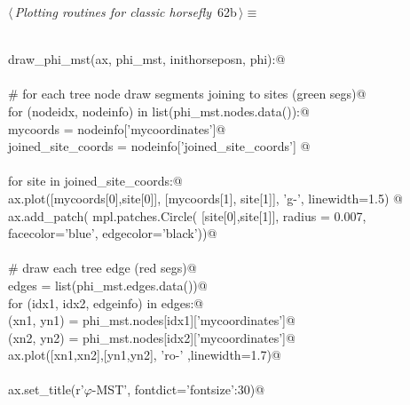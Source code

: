\documentclass[11.5pt]{report}
\begin{document}
\vspace{-0.8cm} \newchunk 

\begin{flushleft} \small\label{scrap90}\raggedright\small
{} $\langle\,${\itshape Plotting routines for classic horsefly}\nobreak\ {\footnotesize {62b}}$\,\rangle\equiv$
\vspace{-1ex}
\begin{list}{}{} \item
\mbox{}\verb@@\\
\mbox{}\verb@def draw_phi_mst(ax, phi_mst, inithorseposn, phi):@\\
\mbox{}\verb@@\\
\mbox{}\verb@     # for each tree node draw segments joining to sites (green segs)@\\
\mbox{}\verb@     for (nodeidx, nodeinfo) in list(phi_mst.nodes.data()):@\\
\mbox{}\verb@         mycoords           = nodeinfo['mycoordinates']@\\
\mbox{}\verb@         joined_site_coords = nodeinfo['joined_site_coords'] @\\
\mbox{}\verb@@\\
\mbox{}\verb@         for site in joined_site_coords:@\\
\mbox{}\verb@               ax.plot([mycoords[0],site[0]], [mycoords[1], site[1]], 'g-', linewidth=1.5) @\\
\mbox{}\verb@               ax.add_patch( mpl.patches.Circle( [site[0],site[1]], radius = 0.007, \@\\
\mbox{}\verb@                                                 facecolor='blue', edgecolor='black'))@\\
\mbox{}\verb@@\\
\mbox{}\verb@     # draw each tree edge (red segs)@\\
\mbox{}\verb@     edges = list(phi_mst.edges.data())@\\
\mbox{}\verb@     for (idx1, idx2, edgeinfo) in edges:@\\
\mbox{}\verb@          (xn1, yn1) =  phi_mst.nodes[idx1]['mycoordinates']@\\
\mbox{}\verb@          (xn2, yn2) =  phi_mst.nodes[idx2]['mycoordinates']@\\
\mbox{}\verb@          ax.plot([xn1,xn2],[yn1,yn2], 'ro-' ,linewidth=1.7)@\\
\mbox{}\verb@@\\
\mbox{}\verb@     ax.set_title(r'$\varphi$-MST', fontdict={'fontsize':30})@\\

\end{list}
\end{flushleft}
\end{document}
